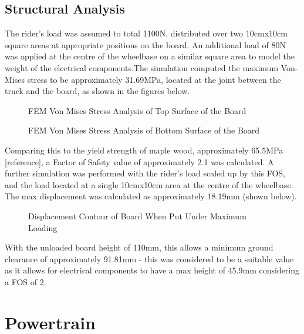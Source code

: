\documentclass[journal,10pt]{IEEEtran}
\begin{document}
    \subsection{Structural Analysis}
        The rider's load was assumed to total 1100N, distributed over two 10cmx10cm square areas at appropriate positions on the board. An additional load of 80N was applied at the centre of the wheelbase on a similar square area to model the weight of the electrical components.The simulation computed the maximum Von-Mises stress to be approximately 31.69MPa, located at the joint between the truck and the board, as shown in the figures below.
        \begin{figure}[H]
            \centering
            \caption{FEM Von Mises Stress Analysis of Top Surface of the Board
            }
            \label{fig:stressTop}
        \end{figure}
        \begin{figure}[H]
            \centering
            \caption{FEM Von Mises Stress Analysis of Bottom Surface of the Board
            }
            \label{fig:stressBottom}
        \end{figure}
        Comparing this to the yield strength of maple wood, approximately 65.5MPa [reference], a Factor of Safety value of approximately 2.1 was calculated. A further simulation was performed with the rider's load scaled up by this FOS, and the load located at a single 10cmx10cm area at the centre of the wheelbase. The max displacement was calculated as approximately 18.19mm (shown below). 
        \begin{figure}[H]
                \centering
                \caption{Displacement Contour of Board When Put Under Maximum Loading
                }
                \label{fig:Displacement}
            \end{figure}
        With the unloaded board height of 110mm, this allows a minimum ground clearance of approximately 91.81mm - this was considered to be a suitable value as it allows for electrical components to have a max height of 45.9mm considering a FOS of 2.
    
\section{Powertrain}
\end{document}

